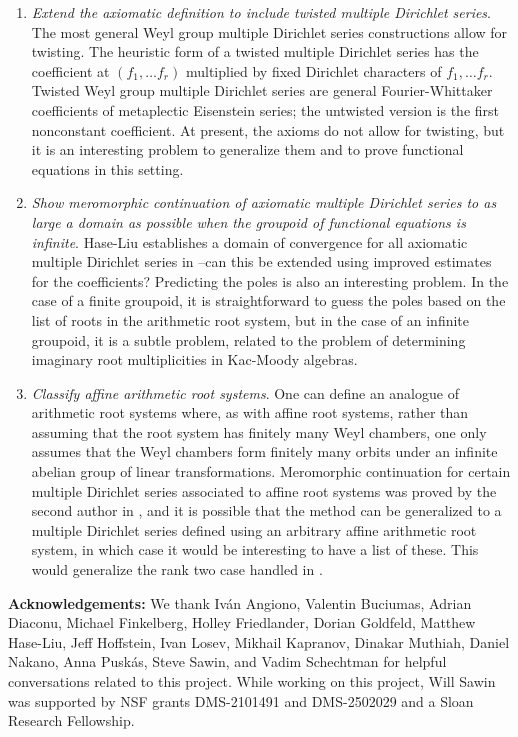 \documentclass[11pt,letterpaper]{article}
\theoremstyle{definition}
\theoremstyle{remark}
\numberwithin{equation}{section}
\theoremstyle{dotless}
\begin{document}
\begin{enumerate}
\item \emph{Extend the axiomatic definition to include twisted multiple Dirichlet series}. The most general Weyl group multiple Dirichlet series constructions allow for twisting. The heuristic form of a twisted multiple Dirichlet series has the coefficient at $(f_1, \ldots f_r)$ multiplied by fixed Dirichlet characters of $f_1, \ldots f_r$. Twisted Weyl group multiple Dirichlet series are general Fourier-Whittaker coefficients of metaplectic Eisenstein series; the untwisted version is the first nonconstant coefficient. At present, the axioms do not allow for twisting, but it is an interesting problem to generalize them and to prove functional equations in this setting.

\item \emph{Show meromorphic continuation of axiomatic multiple Dirichlet series to as large a domain as possible when the groupoid of functional equations is infinite}. Hase-Liu establishes a domain of convergence for all axiomatic multiple Dirichlet series in \cite{HaseLiu24}--can this be extended using improved estimates for the coefficients? Predicting the poles is also an interesting problem. In the case of a finite groupoid, it is straightforward to guess the poles based on the list of roots in the arithmetic root system, but in the case of an infinite groupoid, it is a subtle problem, related to the problem of determining imaginary root multiplicities in Kac-Moody algebras. 

\item  \emph{Classify affine arithmetic root systems}. One can define an analogue of arithmetic root systems where, as with affine root systems, rather than assuming that the root system has finitely many Weyl chambers, one only assumes that the Weyl chambers form finitely many orbits under an infinite abelian group of linear transformations. Meromorphic continuation for certain multiple Dirichlet series associated to affine root systems was proved by the second author in \cite{WhiteheadThesis}, and it is possible that the method can be generalized to a multiple Dirichlet series defined using an arbitrary affine arithmetic root system, in which case it would be interesting to have a list of these. This would generalize the rank two case handled in \cite{Cuntz2018}.

\end{enumerate}

\textbf{Acknowledgements:} We thank Iv\'an Angiono, Valentin Buciumas, Adrian Diaconu, Michael Finkelberg, Holley Friedlander, Dorian Goldfeld, Matthew Hase-Liu, Jeff Hoffstein, Ivan Losev, Mikhail Kapranov, Dinakar Muthiah, Daniel Nakano, Anna Pusk\'{a}s, Steve Sawin, and Vadim Schechtman for helpful conversations related to this project. While working on this project, Will Sawin was supported by NSF grants DMS-2101491 and DMS-2502029 and a Sloan Research Fellowship.
\end{document}
